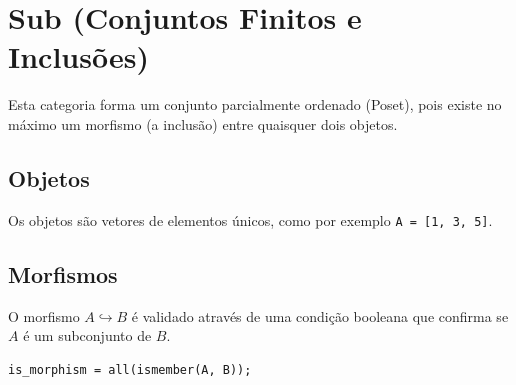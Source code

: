 \section{Sub (Conjuntos Finitos e Inclusões)}

Esta categoria forma um conjunto parcialmente ordenado (Poset), pois existe no máximo um morfismo (a inclusão) entre quaisquer dois objetos.

\subsection{Objetos}
Os objetos são vetores de elementos únicos, como por exemplo \texttt{A = [1, 3, 5]}.

\subsection{Morfismos}
O morfismo $A \hookrightarrow B$ é validado através de uma condição booleana que confirma se $A$ é um subconjunto de $B$.

\begin{lstlisting}[caption={Verificação de Inclusão}]
is_morphism = all(ismember(A, B));
\end{lstlisting}